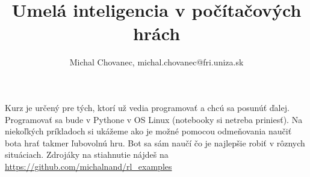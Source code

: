 \documentclass[10pt,a5paper]{article}
\begin{document}
\title{Umelá inteligencia v počítačových hrách}
\author{Michal Chovanec,
michal.chovanec@fri.uniza.sk}
\date{}
\maketitle
\thispagestyle{empty}

Kurz je určený pre tých, ktorí už vedia programovať a chcú sa posunúť ďalej.
Programovať sa bude v Pythone v OS Linux (notebooky si netreba priniesť).
Na niekoľkých príkladoch si ukážeme ako je možné pomocou odmeňovania naučiť bota
hrať takmer ľubovolnú hru. Bot sa sám naučí čo je najlepšie robiť v rôznych situáciach.
Zdrojáky na stiahnutie nájdeš na \url{https://github.com/michalnand/rl\_examples}
\\
\\
\end{document}
